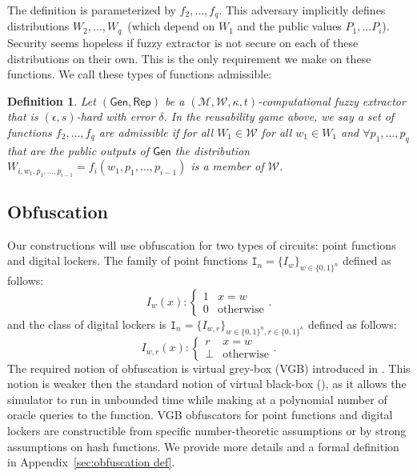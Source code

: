 \documentclass[11pt]{article}
\newcommand{\apref}[1]{\mbox{Appendix~\ref{#1}}}
\newcommand{\class}[1]{{\ensuremath{\mathsf{#1}}}}
\newcommand{\gen}{\ensuremath{\class{Gen}}\xspace}
\newcommand{\rep}{\ensuremath{\class{Rep}}\xspace}
\newcommand{\zo}{\ensuremath{\{0, 1\}}}
\newtheorem{definition}[theorem]{Definition}
\begin{document}
The definition is parameterized by $f_2,..., f_q$.  This adversary implicitly defines distributions $W_2,..., W_q$~(which depend on $W_1$ and the public values $P_1,... P_i$).  Security seems hopeless if fuzzy extractor is not secure on each of these distributions on their own.  This is the only requirement we make on these functions.  We call these types of functions admissible:

\begin{definition}
Let $(\gen, \rep)$ be a $(\mathcal{M}, \mathcal{W}, \kappa, t)$-computational fuzzy extractor that is $(\epsilon, s)$-hard with error $\delta$.  In the reusability game above, we say a set of functions $f_2,..., f_q$ are \emph{admissible} if for all $W_1\in \mathcal{W}$ for all $w_1\in W_1$ and $\forall p_1,..., p_q$ that are the public outputs of $\gen$ the distribution $W_{i,w_1,p_1,..., p_{i-1}} = f_i(w_1,p_1,..., p_{i-1})$ is a member of $\mathcal{W}$.
\end{definition}

\subsection{Obfuscation}
Our constructions will use obfuscation for two types of circuits: point functions and digital lockers. The family of point functions $\mathtt{I}_n = \{I_w\}_{w \in \zo^n}$ defined as follows:
\[
I_w(x):\begin{cases} 1 & x=w\\0 & \text{otherwise}\end{cases}.
\]
and the class of digital lockers is $\mathtt{I}_n = \{I_{w, r}\}_{w \in \zo^n, r\in\zo^\kappa}$ defined as follows:
\[
I_{w, r}(x):\begin{cases} r & x=w\\\perp & \text{otherwise}\end{cases}.
\]
The required notion of obfuscation is virtual grey-box (VGB) introduced in \cite{bitansky2010strong}. This notion is weaker then the standard notion of virtual black-box (\cite{barak2001possibility}), as it allows the simulator to run in unbounded time while making at a polynomial number of oracle queries to the function. VGB obfuscators for point functions and digital lockers are constructible from specific number-theoretic assumptions or by strong assumptions on hash functions.  We provide more details and a formal definition in \apref{sec:obfuscation def}.
\end{document}
